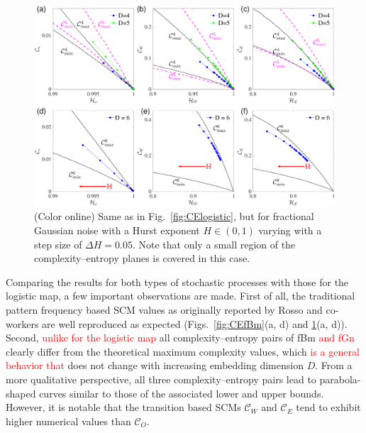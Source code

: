 \documentclass[aip,cha,reprint,nofootinbib]{revtex4-1}
\begin{document}
\begin{figure}
	\centering 
	\includegraphics[width=2\columnwidth]{CompEntropy_fGn.pdf}
\caption{\small{(Color online) Same as in Fig.~\ref{fig:CElogistic}, but for fractional Gaussian noise with a Hurst exponent $H \in (0, 1)$ varying with a step size of $\Delta H=0.05$. Note that only a small region of the complexity--entropy planes is covered in this case. }  \label{fig:CEfGn}}
\end{figure}

Comparing the results for both types of stochastic processes with those for the logistic map, a few important observations are made. First of all, the traditional pattern frequency based SCM values as originally reported by Rosso and co-workers \cite{RossoPRE2007,rossoPRL2007} are well reproduced as expected (Figs.~\ref{fig:CEfBm}(a, d) and \ref{fig:CEfGn}(a, d)). Second, \textcolor{red}{unlike for the logistic map} all complexity--entropy pairs of fBm \textcolor{red}{and fGn} clearly differ from the theoretical maximum complexity values, which \textcolor{red}{is a general behavior that} does not change with increasing embedding dimension $D$. {\color{red}From a more qualitative perspective, all three complexity--entropy pairs lead to parabola-shaped curves similar to those of the associated lower and upper bounds. However, it is notable that the transition based SCMs $\mathcal{C}_{W}$ and $\mathcal{C}_{E}$ tend to exhibit higher numerical values than $\mathcal{C}_O$.} 
\end{document}
